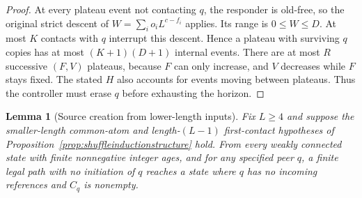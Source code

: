 \documentclass[11pt]{article}
\newtheorem{lemma}[theorem]{Lemma}
\begin{document}
\begin{proof}
At every plateau event not contacting $q$, the responder is old-free,
so the original strict descent of
$W=\sum_i o_iL^{c-f_i}$ applies. Its range is $0\le W\le D$.
At most $K$ contacts with $q$ interrupt this descent. Hence a plateau
with surviving $q$ copies has at most $(K+1)(D+1)$ internal events.
There are at most $R$ successive $(F,V)$ plateaus, because $F$ can
only increase, and $V$ decreases while $F$ stays fixed. The stated
$H$ also accounts for events moving between plateaus. Thus the
controller must erase $q$ before exhausting the horizon.
\end{proof}

\begin{lemma}[Source creation from lower-length inputs]
\label{lem:generalsourcecreation}
Fix $L\ge4$ and suppose the smaller-length common-atom and
length-$(L-1)$ first-contact hypotheses of
Proposition~\ref{prop:shuffleinductionstructure} hold. From every
weakly connected state with finite nonnegative integer ages, and
for any specified peer $q$, a finite legal path with no initiation
of $q$ reaches a state where $q$ has no incoming references and
$C_q$ is nonempty.
\end{lemma}
\end{document}
